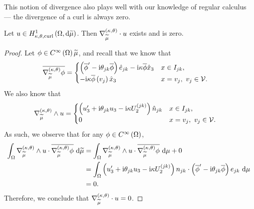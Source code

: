 \documentclass[11pt]{report}
\newcommand{\ktdiv}[1]{\ktgrad_{#1}\cdot}
\begin{document}
This notion of divergence also plays well with our knowledge of regular calculus --- the divergence of a curl is always zero.
\begin{prop}
Let $u\in H^1_{\kappa,\theta,\mathrm{curl}}\left( \Omega, \mathrm{d}\widetilde{\mu} \right)$.
Then $\ktdiv{\dddmes}u$ exists and is zero.
\end{prop}
\begin{proof}
	Let $\phi\in C^{\infty}\left( \Omega \right){\widetilde{\mu}}$, and recall that we know that
	\begin{align*}
		\overline{\nabla^{\left( \kappa, \theta \right)}_{\widetilde{\mu}}\phi} &= 
		\begin{cases}
			\left(  \overline{\phi}' - \mathrm{i}\theta_{jk}\overline{\phi}  \right)\hat{e}_{jk} - \mathrm{i}\kappa\overline{\phi}\hat{x}_3 & x\in I_{jk}, \\
			-\mathrm{i}\kappa\overline{\phi}\left( v_j \right)\hat{x}_3 & x=v_j, \ v_j\in\mathcal{V}.
		\end{cases}
	\end{align*}
	We also know that
	\begin{align*}
		\nabla_{\widetilde{\mu}}^{\left( \kappa, \theta \right)}\wedge u &= 
		\begin{cases}
			\left(  u_3' + \mathrm{i}\theta_{jk}u_3 - \mathrm{i}\kappa U_2^{(jk)}  \right)\hat{n}_{jk} & x\in I_{jk}, \\
			0 & x = v_j, \ v_j\in\mathcal{V}.
		\end{cases}
	\end{align*}
	As such, we observe that for any $\phi\in C^{\infty}\left( \Omega \right)$,
	\begin{align*}
		\int_{\Omega} \nabla_{\widetilde{\mu}}^{\left( \kappa, \theta \right)}\wedge u\cdot\overline{\nabla^{\left( \kappa, \theta \right)}_{\widetilde{\mu}}\phi}  \ \mathrm{d}\widetilde{\mu}
		&= \int_{\Omega} \nabla_{\widetilde{\mu}}^{\left( \kappa, \theta \right)}\wedge u\cdot\overline{\nabla^{\left( \kappa, \theta \right)}_{\widetilde{\mu}}\phi}  \ \mathrm{d}\mu + 0 \\
		&= \int_{\Omega} \left(  u_3' + \mathrm{i}\theta_{jk}u_3 - \mathrm{i}\kappa U_2^{(jk)}  \right)n_{jk} \cdot \left(  \overline{\phi}' - \mathrm{i}\theta_{jk}\overline{\phi}  \right)e_{jk}  \ \mathrm{d}\mu \\
		&= 0.
	\end{align*}
	Therefore, we conclude that $\ktdiv{\dddmes}u = 0$.
\end{proof}
\end{document}
